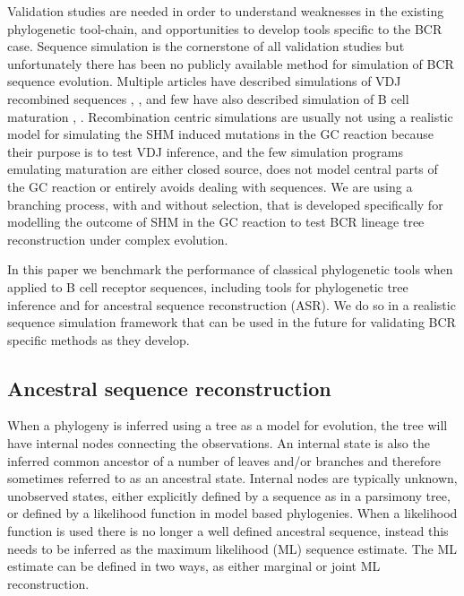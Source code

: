 Validation studies are needed in order to understand weaknesses in the existing phylogenetic tool-chain, and opportunities to develop tools specific to the BCR case.
Sequence simulation is the cornerstone of all validation studies but unfortunately there has been no publicly available method for simulation of BCR sequence evolution.
Multiple articles have described simulations of VDJ recombined sequences \cite{safonova2015igsimulator}, \cite{ralph2016likelihood}, \cite{russ2015htjoinsolver} and few have also described simulation of B cell maturation \cite{shlomchik1998clone}, \cite{kleinstein2003estimating}.
Recombination centric simulations are usually not using a realistic model for simulating the SHM induced mutations in the GC reaction because their purpose is to test VDJ inference, and the few simulation programs emulating maturation are either closed source, does not model central parts of the GC reaction or entirely avoids dealing with sequences.
We are using a branching process, with and without selection, that is developed specifically for modelling the outcome of SHM in the GC reaction to test BCR lineage tree reconstruction under complex evolution.

In this paper we benchmark the performance of classical phylogenetic tools when applied to B cell receptor sequences, including tools for phylogenetic tree inference and for ancestral sequence reconstruction (ASR).
We do so in a realistic sequence simulation framework that can be used in the future for validating BCR specific methods as they develop.




\subsection{Ancestral sequence reconstruction}
When a phylogeny is inferred using a tree as a model for evolution, the tree will have internal nodes connecting the observations.
An internal state is also the inferred common ancestor of a number of leaves and/or branches and therefore sometimes referred to as an ancestral state.
Internal nodes are typically unknown, unobserved states, either explicitly defined by a sequence as in a parsimony tree, or defined by a likelihood function in model based phylogenies.
When a likelihood function is used there is no longer a well defined ancestral sequence, instead this needs to be inferred as the maximum likelihood (ML) sequence estimate.
The ML estimate can be defined in two ways, as either marginal or joint ML reconstruction.

